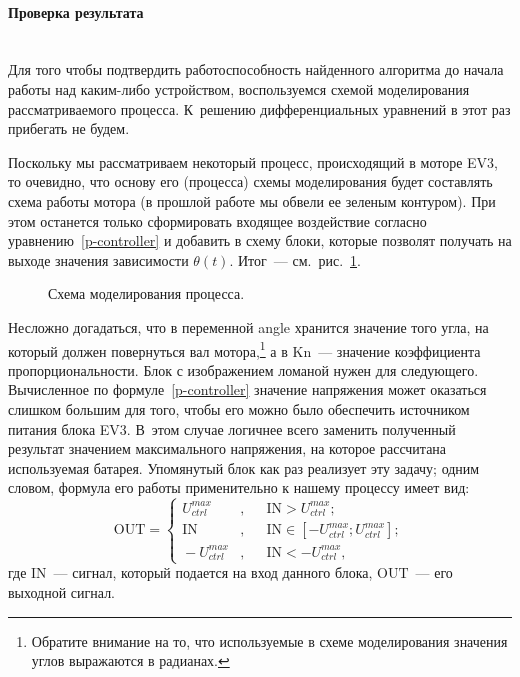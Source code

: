 \documentclass[12pt,a4paper,openany]{extarticle}
\begin{document}
\paragraph*{Проверка результата}$\phantom{-}$\\
\hspace*{\parindent}Для того чтобы подтвердить работоспособность найденного алгоритма до начала работы над каким-либо устройством, воспользуемся схемой моделирования рассматриваемого процесса.
К~решению дифференциальных уравнений в этот раз прибегать не будем.  

Поскольку мы рассматриваем некоторый процесс, происходящий в моторе EV3, то очевидно, что основу его (процесса) схемы моделирования будет составлять схема работы мотора (в прошлой работе мы обвели ее зеленым контуром).
При этом останется только сформировать входящее воздействие согласно уравнению~\eqref{p-controller} и добавить в схему блоки, которые позволят получать на выходе значения зависимости $\theta(t)$.
Итог~--- см.~рис.~\ref{struct_sheme}.

\begin{figure}[h]
	\caption{Схема моделирования процесса.}
	\label{struct_sheme}
\end{figure}

Несложно догадаться, что в переменной angle хранится значение того угла, на который должен повернуться вал мотора\lefteqn,\footnote{Обратите внимание на то, что используемые в схеме моделирования значения углов выражаются в радианах.} а в Kn~--- значение коэффициента пропорциональности.
Блок с изображением ломаной нужен для следующего.
Вычисленное по формуле~\eqref{p-controller} значение напряжения может оказаться слишком большим для того, чтобы его можно было обеспечить источником питания блока EV3.
В~этом случае логичнее всего заменить полученный результат значением максимального напряжения, на которое рассчитана используемая батарея.
Упомянутый блок как раз реализует эту задачу; одним словом, формула его работы применительно к нашему процессу имеет вид:
\begin{equation}
	\mathrm{OUT} = 
	\left\{
	\begin{aligned}
		\!U_{ctrl}^{max}&, &&\mathrm{IN} > U_{ctrl}^{max}; \\
		\!\mathrm{IN}&, &&\mathrm{IN} \in \left[-U_{ctrl}^{max}; U_{ctrl}^{max}\right]; \\
		\!-U_{ctrl}^{max}&, &&\mathrm{IN} < -U_{ctrl}^{max},
	\end{aligned}
	\right.
\end{equation}
где $\mathrm{IN}$~--- сигнал, который подается на вход данного блока, $\mathrm{OUT}$~--- его выходной сигнал.
\end{document}

